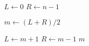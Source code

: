 
\begin{algorithm}[H]
  \begin{algorithmic}[1]
      \State $L \gets 0$
      \State $R \gets n-1$

      \hStatex
        \State $m \gets (L + R) / 2$

	\hStatex
	  \State $L \gets m + 1$
	  \State $R \gets m - 1$
	\Else
	  \State \Return $m$
	\EndIf
      \EndWhile
    \EndProcedure
  \end{algorithmic}
\end{algorithm}

